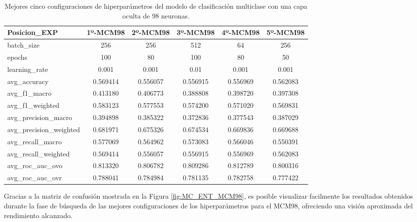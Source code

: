 \begin{table}[H]
\begin{tabular}{|>{\columncolor[HTML]{E0FFFF}}l|c|c|c|c|c|}
\hline
Posicion\_EXP & 1º-MCM98 & 2º-MCM98 & 3º-MCM98 & 4º-MCM98 & 5º-MCM98 \\
\hline
\cellcolor[HTML]{E0FFFF}batch\_size & \cellcolor[HTML]{66ffa8}256 & \cellcolor[HTML]{66ffa8}256 & \cellcolor[HTML]{66ffa8}512 & \cellcolor[HTML]{66ffa8}64 & \cellcolor[HTML]{66ffa8}256 \\
\cellcolor[HTML]{E0FFFF}epochs & \cellcolor[HTML]{b1bafb}100 & \cellcolor[HTML]{b1bafb}80 & \cellcolor[HTML]{b1bafb}100 & \cellcolor[HTML]{b1bafb}80 & \cellcolor[HTML]{b1bafb}50 \\
\cellcolor[HTML]{E0FFFF}learning\_rate & \cellcolor[HTML]{f99595}0.001 & \cellcolor[HTML]{f99595}0.001 & \cellcolor[HTML]{f99595}0.01 & \cellcolor[HTML]{f99595}0.001 & \cellcolor[HTML]{f99595}0.001 \\
\cellcolor[HTML]{E0FFFF}avg\_accuracy & 0.569414 & 0.556057 & 0.556915 & 0.556969 & 0.562083 \\
\cellcolor[HTML]{E0FFFF}avg\_f1\_macro & 0.413180 & 0.406773 & 0.388808 & 0.398720 & 0.397308 \\
\cellcolor[HTML]{E0FFFF}avg\_f1\_weighted & 0.583123 & 0.577553 & 0.574200 & 0.571020 & 0.569831 \\
\cellcolor[HTML]{E0FFFF}avg\_precision\_macro & 0.394898 & 0.385322 & 0.372836 & 0.377543 & 0.387029 \\
\cellcolor[HTML]{E0FFFF}avg\_precision\_weighted & 0.681971 & 0.675326 & 0.674534 & 0.669836 & 0.669688 \\
\cellcolor[HTML]{E0FFFF}avg\_recall\_macro & 0.577069 & 0.564962 & 0.573083 & 0.566046 & 0.550391 \\
\cellcolor[HTML]{E0FFFF}avg\_recall\_weighted & 0.569414 & 0.556057 & 0.556915 & 0.556969 & 0.562083 \\
\cellcolor[HTML]{E0FFFF}avg\_roc\_auc\_ovo & 0.813320 & 0.806782 & 0.809286 & 0.812789 & 0.800316 \\
\cellcolor[HTML]{E0FFFF}avg\_roc\_auc\_ovr & 0.788041 & 0.784984 & 0.781135 & 0.782758 & 0.777422 \\
\hline
\end{tabular}
    \caption{Mejores cinco configuraciones de hiperparámetros del modelo de clasificación multiclase con una capa oculta de 98 neuronas.}
    \label{fig:MULhs98}
\end{table}

Gracias a la matriz de confusión mostrada en la Figura \ref{fig:MC_ENT_MCM98}, es posible visualizar facilmente los resultados obtenidos durante la fase de búsqueda de las mejores configuraciones de los hiperparámetros para el MCM98, ofreciendo una visión aproximada del rendimiento alcanzado.

